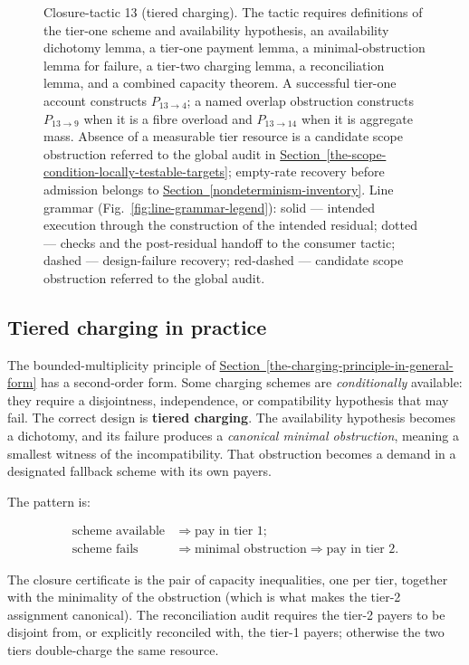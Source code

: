 \documentclass[
  11pt,
]{article}
\theoremstyle{definition}
\newcommand{\secref}[1]{\hyperref[#1]{Section~\ref*{#1}}}
\begin{document}
\begin{figure}[p]
\caption[Closure-tactic 13: tiered charging]{Closure-tactic 13 (tiered charging).  The tactic requires definitions of the tier-one scheme and availability hypothesis, an availability dichotomy lemma, a tier-one payment lemma, a minimal-obstruction lemma for failure, a tier-two charging lemma, a reconciliation lemma, and a combined capacity theorem.  A successful tier-one account constructs \(P_{13\to4}\); a named overlap obstruction constructs \(P_{13\to9}\) when it is a fibre overload and \(P_{13\to14}\) when it is aggregate mass.  Absence of a measurable tier resource is a candidate scope obstruction referred to the global audit in \secref{the-scope-condition-locally-testable-targets}; empty-rate recovery before admission belongs to \secref{nondeterminism-inventory}.  Line grammar (Fig.~\ref{fig:line-grammar-legend}): solid --- intended execution through the construction of the intended residual; dotted --- checks and the post-residual handoff to the consumer tactic; dashed --- design-failure recovery; red-dashed --- candidate scope obstruction referred to the global audit.}
\label{fig:ct13-tiered-charging}
\end{figure}
\FloatBarrier

\subsection*{Tiered charging in practice}

The bounded-multiplicity principle of \secref{the-charging-principle-in-general-form} has a second-order
form. Some charging schemes are \emph{conditionally} available: they
require a disjointness, independence, or compatibility hypothesis that
may fail. The correct design is \textbf{tiered charging}. The
availability hypothesis becomes a dichotomy, and its failure produces a
\emph{canonical minimal obstruction}, meaning a smallest witness of the
incompatibility. That obstruction becomes a demand in a designated
fallback scheme with its own payers.

The pattern is:

\[
\begin{aligned}
\text{scheme available} &\Rightarrow \text{pay in tier 1};\\
\text{scheme fails} &\Rightarrow \text{minimal obstruction} \Rightarrow \text{pay in tier 2}.
\end{aligned}
\]

The closure certificate is the pair of capacity inequalities, one per
tier, together with the minimality of the obstruction (which is what
makes the tier-2 assignment canonical). The reconciliation audit requires
the tier-2 payers to be disjoint from, or explicitly reconciled with, the
tier-1 payers; otherwise the two tiers double-charge the same resource.
\end{document}
